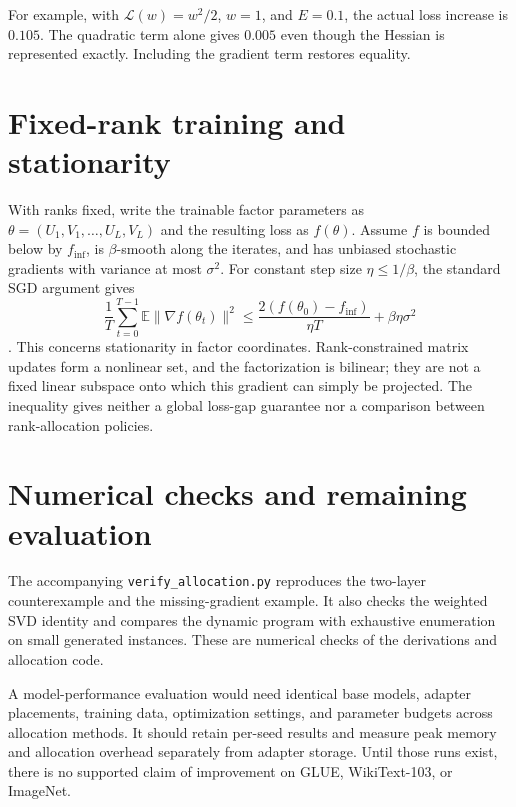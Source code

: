 \documentclass[11pt]{article}
\begin{document}
For example, with $\mathcal L(w)=w^2/2$, $w=1$, and $E=0.1$, the actual loss
increase is $0.105$. The quadratic term alone gives $0.005$ even though the
Hessian is represented exactly. Including the gradient term restores equality.

\section{Fixed-rank training and stationarity}

With ranks fixed, write the trainable factor parameters as
$\theta=(U_1,V_1,\ldots,U_L,V_L)$ and the resulting loss as $f(\theta)$.
Assume $f$ is bounded below by $f_{\inf}$, is $\beta$-smooth along the iterates,
and has unbiased stochastic gradients with variance at most $\sigma^2$.
For constant step size $\eta\leq1/\beta$, the standard SGD argument gives
\[
 \frac1T\sum_{t=0}^{T-1}\mathbb E\|\nabla f(\theta_t)\|^2
 \leq \frac{2(f(\theta_0)-f_{\inf})}{\eta T}+\beta\eta\sigma^2
\]
\cite{ghadimi2013stochastic}. This concerns stationarity in factor coordinates.
Rank-constrained matrix updates form a nonlinear set, and the factorization is
bilinear; they are not a fixed linear subspace onto which this gradient can
simply be projected. The inequality gives neither a global loss-gap guarantee
nor a comparison between rank-allocation policies.

\section{Numerical checks and remaining evaluation}

The accompanying \texttt{verify\_allocation.py} reproduces the two-layer
counterexample and the missing-gradient example. It also checks the weighted
SVD identity and compares the dynamic program with exhaustive enumeration on
small generated instances. These are numerical checks of the derivations and
allocation code.

A model-performance evaluation would need identical base models, adapter
placements, training data, optimization settings, and parameter budgets across
allocation methods. It should retain per-seed results and measure peak memory
and allocation overhead separately from adapter storage. Until those runs exist,
there is no supported claim of improvement on GLUE, WikiText-103, or ImageNet.
\end{document}
